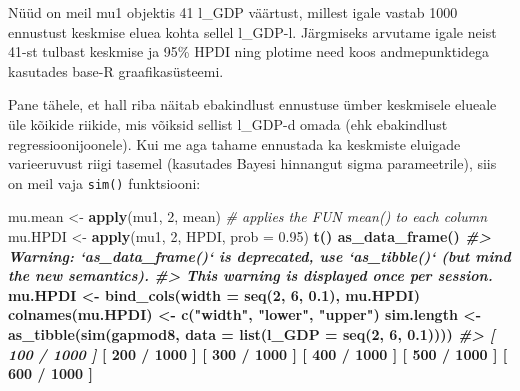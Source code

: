 \documentclass[]{book}
\newenvironment{Shaded}{\begin{snugshade}}{\end{snugshade}}
\newcommand{\CommentTok}[1]{\textcolor[rgb]{0.56,0.35,0.01}{\textit{#1}}}
\newcommand{\DataTypeTok}[1]{\textcolor[rgb]{0.13,0.29,0.53}{#1}}
\newcommand{\DecValTok}[1]{\textcolor[rgb]{0.00,0.00,0.81}{#1}}
\newcommand{\FloatTok}[1]{\textcolor[rgb]{0.00,0.00,0.81}{#1}}
\newcommand{\KeywordTok}[1]{\textcolor[rgb]{0.13,0.29,0.53}{\textbf{#1}}}
\newcommand{\NormalTok}[1]{#1}
\newcommand{\OperatorTok}[1]{\textcolor[rgb]{0.81,0.36,0.00}{\textbf{#1}}}
\newcommand{\StringTok}[1]{\textcolor[rgb]{0.31,0.60,0.02}{#1}}
\begin{document}
Nüüd on meil mu1 objektis 41 l\_GDP väärtust, millest igale vastab 1000 ennustust keskmise eluea kohta sellel l\_GDP-l.
Järgmiseks arvutame igale neist 41-st tulbast keskmise ja 95\% HPDI ning plotime need koos andmepunktidega kasutades base-R graafikasüsteemi.

Pane tähele, et hall riba näitab ebakindlust ennustuse ümber keskmisele elueale üle kõikide riikide, mis võiksid sellist l\_GDP-d omada (ehk ebakindlust regressioonijoonele).
Kui me aga tahame ennustada ka keskmiste eluigade varieeruvust riigi tasemel (kasutades Bayesi hinnangut sigma parameetrile), siis on meil vaja \texttt{sim()} funktsiooni:

\begin{Shaded}
\begin{Highlighting}[]
\NormalTok{mu.mean <-}\StringTok{ }\KeywordTok{apply}\NormalTok{(mu1, }\DecValTok{2}\NormalTok{, mean) }\CommentTok{# applies the FUN mean() to each column}
\NormalTok{mu.HPDI <-}\StringTok{ }\KeywordTok{apply}\NormalTok{(mu1, }\DecValTok{2}\NormalTok{, HPDI, }\DataTypeTok{prob =} \FloatTok{0.95}\NormalTok{) }\OperatorTok{%
\StringTok{  }\KeywordTok{t}\NormalTok{() }\OperatorTok{%
\StringTok{  }\KeywordTok{as_data_frame}\NormalTok{()}
\CommentTok{#> Warning: `as_data_frame()` is deprecated, use `as_tibble()` (but mind the new semantics).}
\CommentTok{#> This warning is displayed once per session.}
\NormalTok{mu.HPDI <-}\StringTok{ }\KeywordTok{bind_cols}\NormalTok{(}\DataTypeTok{width =} \KeywordTok{seq}\NormalTok{(}\DecValTok{2}\NormalTok{, }\DecValTok{6}\NormalTok{, }\FloatTok{0.1}\NormalTok{), mu.HPDI)}
\KeywordTok{colnames}\NormalTok{(mu.HPDI) <-}\StringTok{ }\KeywordTok{c}\NormalTok{(}\StringTok{"width"}\NormalTok{, }\StringTok{"lower"}\NormalTok{, }\StringTok{"upper"}\NormalTok{)}
\NormalTok{sim.length <-}\StringTok{ }\KeywordTok{as_tibble}\NormalTok{(}\KeywordTok{sim}\NormalTok{(gapmod8, }\DataTypeTok{data =} \KeywordTok{list}\NormalTok{(}\DataTypeTok{l_GDP =} \KeywordTok{seq}\NormalTok{(}\DecValTok{2}\NormalTok{, }\DecValTok{6}\NormalTok{, }\FloatTok{0.1}\NormalTok{))))}
\CommentTok{#> [ 100 / 1000 ]}
\NormalTok{[ }\DecValTok{200} \OperatorTok{/}\StringTok{ }\DecValTok{1000}\NormalTok{ ]}
\NormalTok{[ }\DecValTok{300} \OperatorTok{/}\StringTok{ }\DecValTok{1000}\NormalTok{ ]}
\NormalTok{[ }\DecValTok{400} \OperatorTok{/}\StringTok{ }\DecValTok{1000}\NormalTok{ ]}
\NormalTok{[ }\DecValTok{500} \OperatorTok{/}\StringTok{ }\DecValTok{1000}\NormalTok{ ]}
\NormalTok{[ }\DecValTok{600} \OperatorTok{/}\StringTok{ }\DecValTok{1000}\NormalTok{ ]}
}}
\end{Highlighting}
\end{Shaded}
\end{document}
